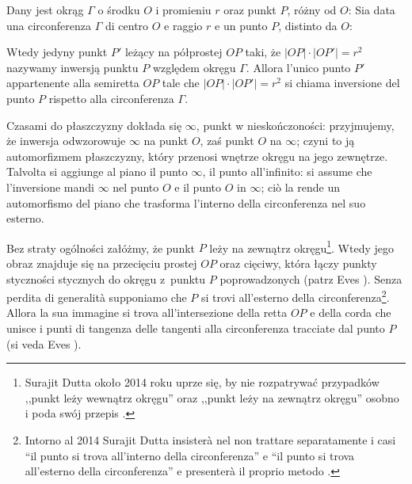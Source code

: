 \begin{definition}
\label{def:inwersja}%
    Dany jest okrąg $\Gamma$ o środku $O$ i promieniu $r$ oraz punkt $P$, różny od $O$: %
    Sia data una circonferenza $\Gamma$ di centro $O$ e raggio $r$ e un punto $P$, distinto da $O$: %
    \begin{figure}
    \end{figure}
    Wtedy jedyny punkt $P'$ leżący na półprostej $OP$ taki, że $|OP| \cdot |OP'| = r^2$ nazywamy inwersją punktu $P$ względem okręgu $\Gamma$. %
    Allora l'unico punto $P'$ appartenente alla semiretta $OP$ tale che $|OP| \cdot |OP'| = r^2$ si chiama inversione del punto $P$ rispetto alla circonferenza $\Gamma$. %

    Czasami do płaszczyzny dokłada się $\infty$, punkt w nieskończoności: przyjmujemy, że inwersja odwzorowuje $\infty$ na punkt $O$, zaś punkt $O$ na $\infty$; czyni to ją automorfizmem płaszczyzny, który przenosi wnętrze okręgu na jego zewnętrze. %
    Talvolta si aggiunge al piano il punto $\infty$, il punto all'infinito: si assume che l'inversione mandi $\infty$ nel punto $O$ e il punto $O$ in $\infty$; ciò la rende un automorfismo del piano che trasforma l'interno della circonferenza nel suo esterno. %
\end{definition}

Bez straty ogólności załóżmy, że punkt $P$ leży na zewnątrz okręgu\footnote{Surajit Dutta około 2014 roku uprze się, by nie rozpatrywać przypadków ,,punkt leży wewnątrz okręgu'' oraz ,,punkt leży na zewnątrz okręgu'' osobno i poda swój przepis \cite{dutta_2014}.}. %
Wtedy jego obraz znajduje się na przecięciu prostej $OP$ oraz cięciwy, która łączy punkty styczności stycznych do okręgu z~punktu $P$ poprowadzonych (patrz Eves \cite[s. 122]{eves1_1972}). %
Senza perdita di generalità supponiamo che $P$ si trovi all'esterno della circonferenza\footnote{Intorno al 2014 Surajit Dutta insisterà nel non trattare separatamente i casi ``il punto si trova all'interno della circonferenza'' e ``il punto si trova all'esterno della circonferenza'' e presenterà il proprio metodo \cite{dutta_2014}.}. %
Allora la sua immagine si trova all'intersezione della retta $OP$ e della corda che unisce i punti di tangenza delle tangenti alla circonferenza tracciate dal punto $P$ (si veda Eves \cite[p. 122]{eves1_1972}). %
%
%

